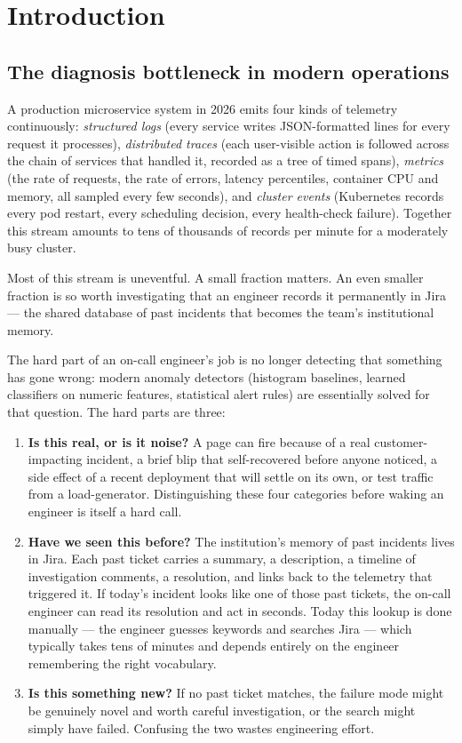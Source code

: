 \section{Introduction}
\label{sec:intro}

\subsection{The diagnosis bottleneck in modern operations}

A production microservice system in 2026 emits four kinds of telemetry continuously: \emph{structured logs} (every service writes JSON-formatted lines for every request it processes), \emph{distributed traces} (each user-visible action is followed across the chain of services that handled it, recorded as a tree of timed spans), \emph{metrics} (the rate of requests, the rate of errors, latency percentiles, container CPU and memory, all sampled every few seconds), and \emph{cluster events} (Kubernetes records every pod restart, every scheduling decision, every health-check failure). Together this stream amounts to tens of thousands of records per minute for a moderately busy cluster.

Most of this stream is uneventful. A small fraction matters. An even smaller fraction is so worth investigating that an engineer records it permanently in Jira --- the shared database of past incidents that becomes the team's institutional memory.

The hard part of an on-call engineer's job is no longer detecting that something has gone wrong: modern anomaly detectors (histogram baselines, learned classifiers on numeric features, statistical alert rules) are essentially solved for that question. The hard parts are three:

\begin{enumerate}
\item \textbf{Is this real, or is it noise?} A page can fire because of a real customer-impacting incident, a brief blip that self-recovered before anyone noticed, a side effect of a recent deployment that will settle on its own, or test traffic from a load-generator. Distinguishing these four categories before waking an engineer is itself a hard call.
\item \textbf{Have we seen this before?} The institution's memory of past incidents lives in Jira. Each past ticket carries a summary, a description, a timeline of investigation comments, a resolution, and links back to the telemetry that triggered it. If today's incident looks like one of those past tickets, the on-call engineer can read its resolution and act in seconds. Today this lookup is done manually --- the engineer guesses keywords and searches Jira --- which typically takes tens of minutes and depends entirely on the engineer remembering the right vocabulary.
\item \textbf{Is this something new?} If no past ticket matches, the failure mode might be genuinely novel and worth careful investigation, or the search might simply have failed. Confusing the two wastes engineering effort.
\end{enumerate}

